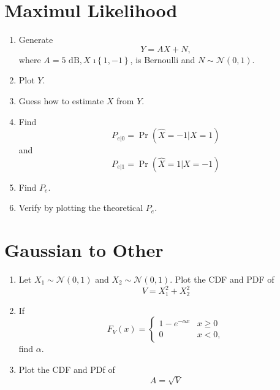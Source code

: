 \documentclass[journal,12pt,twocolumn]{IEEEtran}
\numberwithin{equation}{section}
\renewcommand\thesection{\arabic{section}}
\providecommand{\pr}[1]{\ensuremath{\Pr\left(#1\right)}}
\providecommand{\cbrak}[1]{\ensuremath{\left\{#1\right\}}}
\providecommand{\gauss}[2]{\mathcal{N}\ensuremath{\left(#1,#2\right)}}
\begin{document}
\section{Maximul Likelihood}
\begin{enumerate}[label=\thesection.\arabic*
        ,ref=\thesection.\theenumi]
    \item Generate
          \begin{equation}
              Y = AX+N,
          \end{equation}
          where $A = 5 \text{ dB}, X$ \i $\cbrak{1,-1}$,  is Bernoulli and $N \sim \gauss{0}{1}$.
    \item Plot $Y$.
    \item Guess how to estimate $X$ from $Y$.
    \item
          \label{ml-ch4_sim}
          Find
          \begin{equation}
              P_{e|0} = \pr{\hat{X} = -1|X=1}
          \end{equation}
          and
          \begin{equation}
              P_{e|1} = \pr{\hat{X} = 1|X=-1}
          \end{equation}
    \item Find $P_e$.
    \item
          Verify by plotting  the theoretical $P_e$.
\end{enumerate}
\section{Gaussian to Other}
\begin{enumerate}[label=\thesection.\arabic*
        ,ref=\thesection.\theenumi]
    \item
          Let $X_1 \sim  \gauss{0}{1}$ and $X_2 \sim  \gauss{0}{1}$. Plot the CDF and PDF of
          \begin{equation}
              V = X_1^2 + X_2^2
          \end{equation}
    \item
          If
          \begin{equation}
              F_{V}(x) =
              \begin{cases}
                  1 - e^{-\alpha x} & x \geq 0 \\
                  0                 & x < 0,
              \end{cases}
          \end{equation}
          find $\alpha$.
    \item
          \label{ch3_raleigh_sim}
          Plot the CDF and PDf of
          \begin{equation}
              A = \sqrt{V}
          \end{equation}
\end{enumerate}
\end{document}
